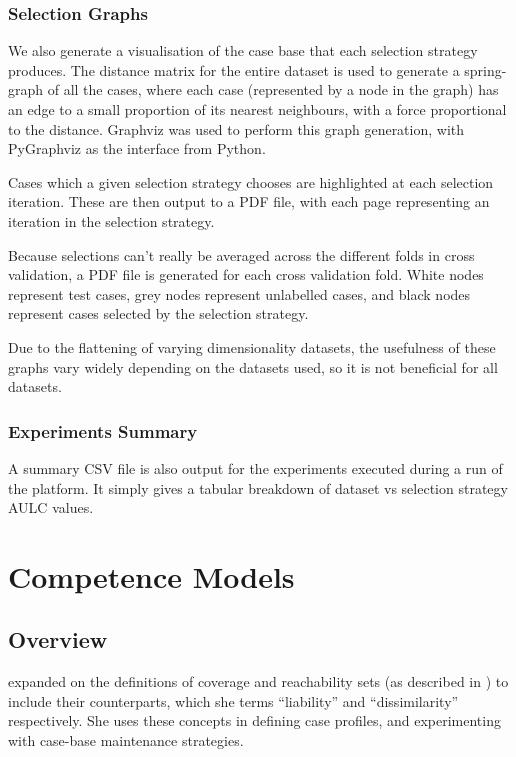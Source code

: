 \documentclass[a4paper,11pt]{report}
\begin{document}
\subsection{Selection Graphs}
We also generate a visualisation of the case base that each selection strategy produces. The distance matrix for the entire dataset is used to generate a spring-graph of all the cases, where each case (represented by a node in the graph) has an edge to a small proportion of its nearest neighbours, with a force proportional to the distance. Graphviz \citep{prog:graphviz} was used to perform this graph generation, with PyGraphviz \citep{prog:pygraphviz} as the interface from Python.

Cases which a given selection strategy chooses are highlighted at each selection iteration. These are then output to a PDF file, with each page representing an iteration in the selection strategy.

Because selections can't really be averaged across the different folds in cross validation, a PDF file is generated for each cross validation fold. White nodes represent test cases, grey nodes represent unlabelled cases, and black nodes represent cases selected by the selection strategy.

Due to the flattening of varying dimensionality datasets, the usefulness of these graphs vary widely depending on the datasets used, so it is not beneficial for all datasets.

\subsection{Experiments Summary}
A summary CSV file is also output for the experiments executed during a run of the platform. It simply gives a tabular breakdown of dataset vs selection strategy AULC values.

\chapter{Competence Models\label{cha:CompetenceModels}}
\section{Overview}

\citet{Delany2009} expanded on the definitions of coverage and reachability sets (as described in \citet{Smyth1995}) to include their counterparts, which she terms ``liability'' and ``dissimilarity'' respectively. She uses these concepts in defining case profiles, and experimenting with case-base maintenance strategies.
\end{document}
